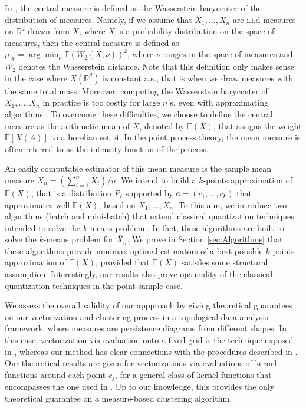 \documentclass[noinfoline,preprint]{article}
\newcommand{\cb}{\mathbf{c}}
\newcommand{\R}{\mathbb{R}}
\newcommand{\E}{\mathbb{E}}
\renewcommand{\1}{\mathds 1}
\begin{document}
In \cite{Cuturi13}, the central measure is defined as the Wasserstein barycenter of the distribution of measures. Namely, if we assume that $X_1, \hdots, X_n$ are i.i.d measures on $\R^d$ drawn from $X$, where $X$ is a probability distribution on the space of measures, then the central measure is defined as $\mu_{W} = \arg\min_{\nu} \mathbb{E} \left ( W_2(X,\nu) \right )^2$, where $\nu$ ranges in the space of measures and $W_2$ denotes the Wasserstein distance. Note that this definition only makes sense in the case where $X(\R^d)$ is constant a.s., that is when we draw measures with the same total mass. Moreover, computing the Wasserstein barycenter of $X_1, \hdots, X_n$ in practice is too costly for large $n$'s, even with approximating algorithms \cite{Cuturi13,Rabin12}. To overcome these difficulties, we choose to define the central measure as the arithmetic mean of $X$, denoted by $\E(X)$, that assigns the weight $\E\left [X(A)\right ]$ to a borelian set $A$. In the point process theory, the mean measure is often referred to as the intensity function of the process. 

An easily computable estimator of this mean measure is the sample mean measure $\bar{X}_n = \left ( \sum_{i=1}^n X_i \right )/n$. We intend to build a $k$-points approximation of $\E(X)$, that is a distribution $P_{\cb}$ supported by $\cb=(c_1, \hdots, c_k)$ that approximates well $\E(X)$, based on $X_1, \hdots, X_n$. To this aim, we introduce two algorithms (batch and mini-batch) that extend classical quantization techniques intended to solve the $k$-means problem \cite{MacQueen67}. In fact, these algorithms are built to solve the $k$-means problem for $\bar{X}_n$. We prove in Section \ref{sec:Algorithms} that these algorithms provide minimax optimal estimators of a best possible $k$-points approximation of $\E(X)$, provided that $\E(X)$ satisfies some structural assumption. Interestingly, our results also prove optimality of the classical quantization techniques \cite{MacQueen67,Lloyd82} in the point sample case.

We assess the overall validity of our appproach by giving theoretical guarantees on our vectorization and clustering process in a topological data analysis framework, where measures are persistence diagrams from different shapes. In this case, vectorization via evaluation onto a fixed grid is the technique exposed in \cite{Adams17}, whereas our method has clear connections with the procedures described in \cite{Zielinski18,Royer19}.
Our theoretical results are given for vectorizations via evaluations of kernel functions around each point $c_j$, for a general class of kernel functions that encompasses the one used in \cite{Royer19}. Up to our knowledge, this provides the only theoretical guarantee on a measure-based clustering algorithm. 
\end{document}
